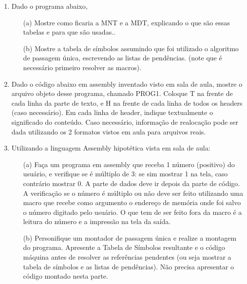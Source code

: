 \begin{enumerate}

    \item
    Dado o programa abaixo,    

    \begin{itemize}
        \item [(a)]
        Mostre como ficaria a MNT e a MDT, 
        explicando o que são essas tabelas e para que são usadas..

        \item [(b)]
        Mostre a tabela de símbolos assumindo que foi utilizado
        o algoritmo de passagem única, escrevendo as listas de pendências.
        (note que é necessário primeiro resolver as macros).
    \end{itemize}    

    \item
    Dado o código abaixo em assembly inventado visto em sala de aula,
    mostre o arquivo objeto desse programa, chamado PROG1.
    Coloque T na frente de cada linha da parte de texto,
    e H na frente de cada linha de todos os headers (caso necessário).
    Em cada linha de header, indique textualmente o significado do conteúdo.
    Caso necessário, informação de realocação pode ser dada 
    utilizando os 2 formatos vistos em aula para arquivos reais.
    
    \item
    Utilizando a linguagem Assembly hipotética vista em sala de aula:
    \begin{itemize}
        \item [(a)]
        Faça um programa em assembly que receba 1 número (positivo) do usuário, 
        e verifique se é múltiplo de 3:
        se sim mostrar 1 na tela, caso contrário mostrar 0. 
        A parte de dados deve ir depois da parte de código.
        A verificação se o número é múltiplo ou não 
        deve ser feito utilizando uma macro que recebe como argumento 
        o endereço de memória onde foi salvo o número digitado pelo usuário. 
        O que tem de ser feito fora da macro 
        é a leitura do número e a impressão na tela da saída.

        \item [(b)]
        Personifique um montador de passagem única e realize a montagem do programa.
        Apresente a Tabela de Símbolos resultante 
        e o código máquina antes de resolver as referências pendentes
        (ou seja mostrar a tabela de símbolos e as listas de pendências).
        Não precisa apresentar o código montado nesta parte.
    \end{itemize}


\end{enumerate}
